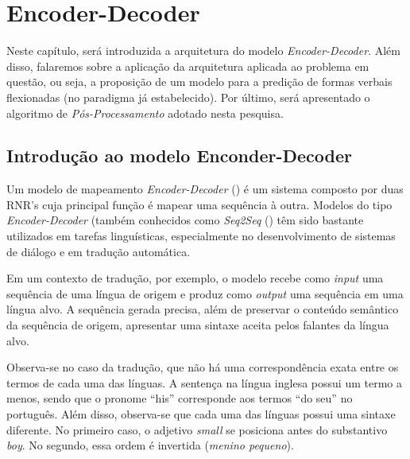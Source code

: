 \chapter{Encoder-Decoder}
\label{ch:05}

Neste capítulo, será introduzida a arquitetura do modelo \textit{Encoder-Decoder}. Além disso, falaremos sobre a aplicação da arquitetura aplicada ao problema em questão, ou seja, a proposição de um modelo para a predição de formas verbais flexionadas (no paradigma já estabelecido). Por último, será apresentado o algoritmo de \textit{Pós-Processamento} adotado nesta pesquisa.

\section{Introdução ao modelo Enconder-Decoder}
\label{sec:intro-sec-sec}
Um modelo de mapeamento \textit{Encoder-Decoder} (\cite{enc-dec:2014}) é um sistema composto por duas RNR's cuja principal função é mapear uma sequência à outra. Modelos do tipo \textit{Encoder-Decoder} (também conhecidos como \textit{Seq2Seq} (\cite{seq2seq:2014}) têm sido bastante utilizados em tarefas linguísticas, especialmente no desenvolvimento de sistemas de diálogo e em tradução automática.

Em um contexto de tradução, por exemplo, o modelo recebe como \textit{input }uma sequência de uma língua de origem e produz como \textit{output} uma sequência em uma língua alvo. A sequência gerada precisa, além de preservar o conteúdo semântico da sequência de origem, apresentar uma sintaxe aceita pelos falantes da língua alvo. 


Observa-se no caso da tradução, que não há uma correspondência exata entre os termos de cada uma das línguas. A sentença na língua inglesa possui um termo a menos, sendo que o pronome “his” corresponde aos termos “do seu” no português. Além disso, observa-se que cada uma das línguas possui uma sintaxe diferente. No primeiro caso, o adjetivo \textit{small} se posiciona antes do substantivo \textit{boy}. No segundo, essa ordem é invertida (\textit{menino pequeno}). 

